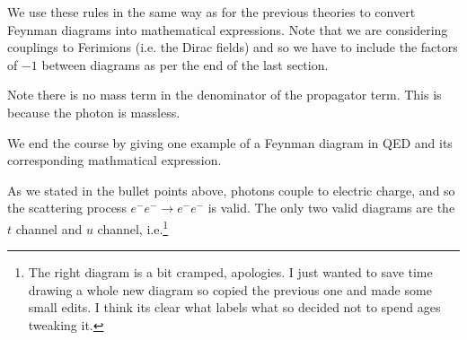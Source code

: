 We use these rules in the same way as for the previous theories to convert Feynman diagrams into mathematical expressions. Note that we are considering couplings to Ferimions (i.e. the Dirac fields) and so we have to include the factors of $-1$ between diagrams as per the end of the last section. 

\br 
    Note there is no mass term in the denominator of the propagator term. This is because the photon is massless. 
\er 



We end the course by giving one example of a Feynman diagram in QED and its corresponding mathmatical expression. 



\bex 
    As we stated in the bullet points above, photons couple to electric charge, and so the scattering process $e^-e^-\to e^-e^-$ is valid. The only two valid diagrams are the $t$ channel and $u$ channel, i.e.\footnote{The right diagram is a bit cramped, apologies. I just wanted to save time drawing a whole new diagram so copied the previous one and made some small edits. I think its clear what labels what so decided not to spend ages tweaking it.}
